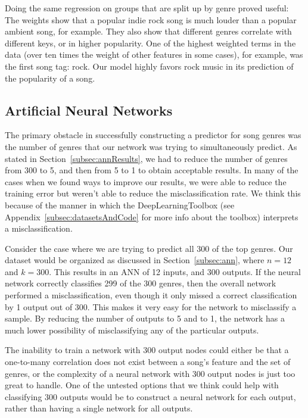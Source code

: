 \documentclass[12pt]{article}
\begin{document}
Doing the same regression on groups that are split up by genre proved useful: The weights show that a popular indie rock song is much louder than a popular ambient song, for example. They also show that different genres correlate with different keys, or in higher popularity. One of the highest weighted terms in the data (over ten times the weight of other features in some cases), for example, was the first song tag: rock. Our model highly favors rock music in its prediction of the popularity of a song.
\subsection{Artificial Neural Networks}
\label{subsec:annDisc}
The primary obstacle in successfully constructing a predictor for song genres was the number of genres that our network was trying to simultaneously predict. As stated in Section~\ref{subsec:annResults}, we had to reduce the number of genres from 300 to 5, and then from 5 to 1 to obtain acceptable results. In many of the cases when we found ways to improve our results, we were able to reduce the training error but weren't able to reduce the misclassification rate. We think this because of the manner in which the DeepLearningToolbox (see Appendix~\ref{subsec:datasetsAndCode} for more info about the toolbox) interprets a misclassification. 

Consider the case where we are trying to predict all 300 of the top genres. Our dataset would be organized as discussed in Section~\ref{subsec:ann}, where $n = 12$ and $k = 300$. This results in an ANN of 12 inputs, and 300 outputs. If the neural network correctly classifies 299 of the 300 genres, then the overall network performed a misclassification, even though it only missed a correct classification by 1 output out of 300. This makes it very easy for the network to misclassify a sample. By reducing the number of outputs to 5 and to 1, the network has a much lower possibility of misclassifying any of the particular outputs. 

The inability to train a network with 300 output nodes could either be that a one-to-many correlation does not exist between a song's feature and the set of genres, or the complexity of a neural network with 300 output nodes is just too great to handle. One of the untested options that we think could help with classifying 300 outputs would be to construct a neural network for each output, rather than having a single network for all outputs. 
\end{document}
